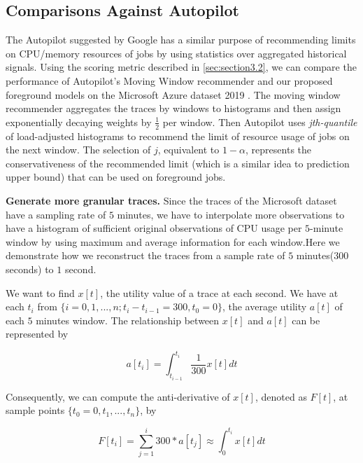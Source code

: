 \documentclass[sigplan,10pt,review,anonymous]{acmart}
\begin{document}
\subsection{Comparisons Against Autopilot}

The Autopilot suggested by Google \cite{10.1145/3342195.3387524} has a similar
purpose of recommending limits on CPU/memory resources of jobs by using
statistics over aggregated historical signals. Using the scoring metric
described in \cref{sec:section3.2}, we can compare the performance of
Autopilot's Moving Window recommender and our proposed foreground models on the
Microsoft Azure dataset 2019 \cite{cortez2017resource}. The moving window recommender aggregates the traces by
windows to histograms and then assign exponentially decaying weights by
$\frac{1}{2}$ per window. Then Autopilot uses \textit{jth-quantile} of
load-adjusted histograms to recommend the limit of resource usage of jobs on the
next window. The selection of $j$, equivalent to $1 - \alpha$, represents the
conservativeness of the recommended limit (which is a similar idea to prediction
upper bound) that can be used on foreground jobs. 

\textbf{Generate more granular traces.} Since the traces of the Microsoft
dataset have a sampling rate of $5$ minutes, we have to interpolate more
observations to have a histogram of sufficient original observations of CPU
usage per $5$-minute window by using maximum and average information for each
window.Here we demonstrate how we reconstruct the traces from a sample rate of
$5$ minutes($300$ seconds) to $1$ second. 

We want to find $x[t]$, the utility value of a trace at each second. We have
at each $t_i$ from $\{i = 0,1, ..., n; t_i - t_{i-1} = 300, t_0 = 0\}$, the
average utility $a[t]$ of each $5$ minutes window. The relationship between
$x[t]$ and $a[t]$ can be represented by 

\begin{equation}
  a[t_i] = \int_{t_{i-1}}^{t_i}\frac{1}{300}x[t]dt
\end{equation}

Consequently, we can compute the anti-derivative of $x[t]$, denoted as $F[t]$,
at sample points $\{t_0 = 0,t_1,...,t_n\}$, by 

\begin{equation}
  F[t_i] = \sum_{j=1}^{i} 300 * a[t_j] \approx \int_{0}^{t_i}x[t]dt
\end{equation}
\end{document}
